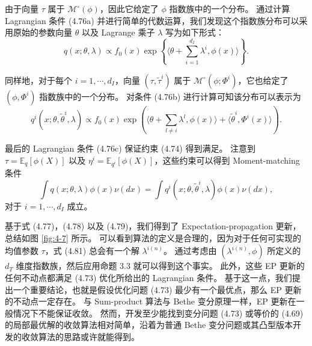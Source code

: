 由于向量 $\tau$ 属于 $\mathcal{M}^\circ(\phi)$，因此它给定了 $\phi$ 指数族中的一个分布。
通过计算 Lagrangian 条件 (4.76a) 并进行简单的代数运算，我们发现这个指数族分布可以采用原始的参数向量 $\theta$ 以及 Lagrange 乘子 $\lambda$ 写为如下形式：
\begin{equation}
    q(x; \theta, \lambda) \propto f_0(x)\exp\left\{\langle\theta+\sum_{i = 1}^{d_I}\lambda^i, \phi(x)\rangle\right\}.
\end{equation}

同样地，对于每个 $i = 1, \cdots, d_I$，向量 $(\tau, \tilde{\tau}^i)$ 属于 $\mathcal{M}^\circ(\phi; \Phi^i)$，它也给定了 $(\phi, \Phi^i)$ 指数族中的一个分布。
对条件 (4.76b) 进行计算可知该分布可以表示为
\begin{equation}
    q^i(x; \theta, \tilde{\theta}^i, \lambda) \propto f_0(x)\exp(\langle\theta+\sum_{l \neq i}\lambda^l, \phi(x)\rangle + \langle\tilde{\theta}^i, \Phi^i(x)\rangle).
\end{equation}

最后的 Lagrangian 条件 (4.76c) 保证约束 (4.74) 得到满足。
注意到 $\tau = \mathbb{E}_q[\phi(X)]$ 以及 $\eta^i = \mathbb{E}_{q^i}[\phi(X)]$，这些约束可以得到 Moment-matching 条件
\begin{equation}
    \int q(x; \theta, \lambda)\phi(x)\nu(dx) = \int q^i(x; \theta, \tilde{\theta}^i, \lambda)\phi(x)\nu(dx), 
\end{equation}
对于 $i = 1, \cdots, d_I$ 成立。

基于式 (4.77)，(4.78) 以及 (4.79)，我们得到了 Expectation-propagation 更新，总结如图 \ref{fig:4-7} 所示。
可以看到算法的定义是合理的，因为对于任何可实现的均值参数 $\tau$，式 (4.81) 总会有一个解 $\lambda^{i(n)}$。
通过考虑由 $(\lambda^{i(n)}, \phi)$ 所定义的 $d_T$ 维度指数族，然后应用命题 3.3 就可以得到这个事实。
此外，这些 EP 更新的任何不动点都满足 (4.73) 优化所给出的 Lagrangian 条件。
基于这一点，我们提出一个重要结论，也就是假设优化问题 (4.73) 最少有一个最优点，那么 EP 更新的不动点一定存在。
与 Sum-product 算法与 Bethe 变分原理一样，EP 更新在一般情况下不能保证收敛。
然而，开发至少能找到变分问题 (4.73) 或等价的 (4.69) 的局部最优解的收敛算法相对简单，沿着为普通 Bethe 变分问题或其凸型版本开发的收敛算法的思路或许就能得到。

